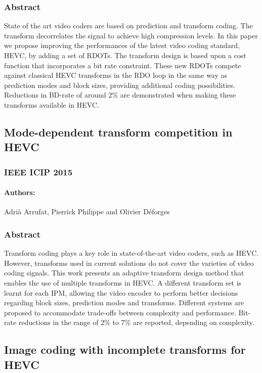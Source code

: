 \documentclass[11pt,a4paper,openright,twoside]{book}
\numberwithin{equation}{section} %
\numberwithin{figure}{section} %
\numberwithin{table}{section} %
\begin{document}
\subsubsection*{Abstract}
\label{ssub:tc_abstract}

State of the art video coders are based on prediction and transform coding.
The transform decorrelates the signal to achieve high compression levels.
In this paper we propose improving the performances of the latest video coding
standard, \acs{HEVC}, by adding a set of \acp{RDOT}.
The transform design is based upon a cost function that incorporates a bit
rate constraint.
These new \acp{RDOT} compete against classical \acs{HEVC} transforms in the
\ac{RDO} loop in the same way as prediction modes and block sizes, providing
additional coding possibilities.
Reductions in \acs{BD}-rate of around 2\% are demonstrated when making these
transforms available in \acs{HEVC}.

\subsection*{Mode-dependent transform competition in HEVC}
\subsubsection*{IEEE ICIP 2015}
\paragraph{\textsf{Authors:}}
	Adrià Arrufat, Pierrick Philippe and Olivier Déforges
\subsubsection*{Abstract}

Transform coding plays a key role in state-of-the-art video coders, such as
\acs{HEVC}.
However, transforms used in current solutions do not cover the varieties
of video coding signals.
This work presents an adaptive transform design method that enables the use of
multiple transforms in \acs{HEVC}.
A different transform set is learnt for each \acl{IPM}, allowing the video
encoder to perform better decisions regarding block sizes, prediction modes
and transforms.
Different systems are proposed to accommodate trade-offs between complexity
and performance.
Bit-rate reductions in the range of 2\% to 7\% are reported, depending on
complexity.

\subsection*{Image coding with incomplete transforms for HEVC}
\end{document}
